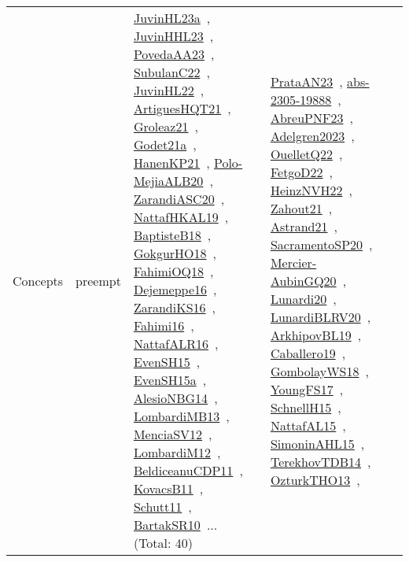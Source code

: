 {\begin{longtable}{lp{3cm}>{\raggedright\arraybackslash}p{6cm}>{\raggedright\arraybackslash}p{6cm}>{\raggedright\arraybackslash}p{8cm}}
Concepts & preempt & \href{works/JuvinHL23a.pdf}{JuvinHL23a}~\cite{JuvinHL23a}, \href{works/JuvinHHL23.pdf}{JuvinHHL23}~\cite{JuvinHHL23}, \href{works/PovedaAA23.pdf}{PovedaAA23}~\cite{PovedaAA23}, \href{works/SubulanC22.pdf}{SubulanC22}~\cite{SubulanC22}, \href{works/JuvinHL22.pdf}{JuvinHL22}~\cite{JuvinHL22}, \href{works/ArtiguesHQT21.pdf}{ArtiguesHQT21}~\cite{ArtiguesHQT21}, \href{works/Groleaz21.pdf}{Groleaz21}~\cite{Groleaz21}, \href{works/Godet21a.pdf}{Godet21a}~\cite{Godet21a}, \href{works/HanenKP21.pdf}{HanenKP21}~\cite{HanenKP21}, \href{works/Polo-MejiaALB20.pdf}{Polo-MejiaALB20}~\cite{Polo-MejiaALB20}, \href{works/ZarandiASC20.pdf}{ZarandiASC20}~\cite{ZarandiASC20}, \href{works/NattafHKAL19.pdf}{NattafHKAL19}~\cite{NattafHKAL19}, \href{works/BaptisteB18.pdf}{BaptisteB18}~\cite{BaptisteB18}, \href{works/GokgurHO18.pdf}{GokgurHO18}~\cite{GokgurHO18}, \href{works/FahimiOQ18.pdf}{FahimiOQ18}~\cite{FahimiOQ18}, \href{works/Dejemeppe16.pdf}{Dejemeppe16}~\cite{Dejemeppe16}, \href{works/ZarandiKS16.pdf}{ZarandiKS16}~\cite{ZarandiKS16}, \href{works/Fahimi16.pdf}{Fahimi16}~\cite{Fahimi16}, \href{works/NattafALR16.pdf}{NattafALR16}~\cite{NattafALR16}, \href{works/EvenSH15.pdf}{EvenSH15}~\cite{EvenSH15}, \href{works/EvenSH15a.pdf}{EvenSH15a}~\cite{EvenSH15a}, \href{works/AlesioNBG14.pdf}{AlesioNBG14}~\cite{AlesioNBG14}, \href{works/LombardiMB13.pdf}{LombardiMB13}~\cite{LombardiMB13}, \href{works/MenciaSV12.pdf}{MenciaSV12}~\cite{MenciaSV12}, \href{works/LombardiM12.pdf}{LombardiM12}~\cite{LombardiM12}, \href{works/BeldiceanuCDP11.pdf}{BeldiceanuCDP11}~\cite{BeldiceanuCDP11}, \href{works/KovacsB11.pdf}{KovacsB11}~\cite{KovacsB11}, \href{works/Schutt11.pdf}{Schutt11}~\cite{Schutt11}, \href{works/BartakSR10.pdf}{BartakSR10}~\cite{BartakSR10}... (Total: 40) & \href{works/PrataAN23.pdf}{PrataAN23}~\cite{PrataAN23}, \href{works/abs-2305-19888.pdf}{abs-2305-19888}~\cite{abs-2305-19888}, \href{works/AbreuPNF23.pdf}{AbreuPNF23}~\cite{AbreuPNF23}, \href{works/Adelgren2023.pdf}{Adelgren2023}~\cite{Adelgren2023}, \href{works/OuelletQ22.pdf}{OuelletQ22}~\cite{OuelletQ22}, \href{works/FetgoD22.pdf}{FetgoD22}~\cite{FetgoD22}, \href{works/HeinzNVH22.pdf}{HeinzNVH22}~\cite{HeinzNVH22}, \href{works/Zahout21.pdf}{Zahout21}~\cite{Zahout21}, \href{works/Astrand21.pdf}{Astrand21}~\cite{Astrand21}, \href{works/SacramentoSP20.pdf}{SacramentoSP20}~\cite{SacramentoSP20}, \href{works/Mercier-AubinGQ20.pdf}{Mercier-AubinGQ20}~\cite{Mercier-AubinGQ20}, \href{works/Lunardi20.pdf}{Lunardi20}~\cite{Lunardi20}, \href{works/LunardiBLRV20.pdf}{LunardiBLRV20}~\cite{LunardiBLRV20}, \href{works/ArkhipovBL19.pdf}{ArkhipovBL19}~\cite{ArkhipovBL19}, \href{works/Caballero19.pdf}{Caballero19}~\cite{Caballero19}, \href{works/GombolayWS18.pdf}{GombolayWS18}~\cite{GombolayWS18}, \href{works/YoungFS17.pdf}{YoungFS17}~\cite{YoungFS17}, \href{works/SchnellH15.pdf}{SchnellH15}~\cite{SchnellH15}, \href{works/NattafAL15.pdf}{NattafAL15}~\cite{NattafAL15}, \href{works/SimoninAHL15.pdf}{SimoninAHL15}~\cite{SimoninAHL15}, \href{works/TerekhovTDB14.pdf}{TerekhovTDB14}~\cite{TerekhovTDB14}, \href{works/OzturkTHO13.pdf}{OzturkTHO13}~\cite{OzturkTHO13}, 
\end{longtable}}
